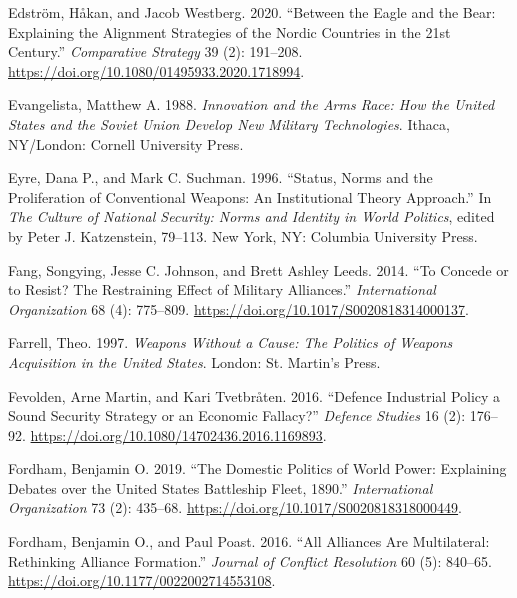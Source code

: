 \documentclass[
  12,
  letterpaper,
  DIV=11,
  numbers=noendperiod]{scrartcl}
\newlength{\cslhangindent}
\newlength{\cslentryspacingunit} %
\newenvironment{CSLReferences}[2] %
 {%
  \setlength{\parindent}{0pt}
  \ifodd #1
  \let\oldpar\par
  \def\par{\hangindent=\cslhangindent\oldpar}
  \fi
  \setlength{\parskip}{#2\cslentryspacingunit}
 }%
 {}
\begin{document}
\begin{CSLReferences}{1}{0}
\leavevmode{}%
Edström, Håkan, and Jacob Westberg. 2020. {``Between the Eagle and the
Bear: {Explaining} the Alignment Strategies of the {Nordic} Countries in
the 21st Century.''} \emph{Comparative Strategy} 39 (2): 191--208.
\url{https://doi.org/10.1080/01495933.2020.1718994}.

\leavevmode{}%
Evangelista, Matthew A. 1988. \emph{Innovation and the {Arms Race}:
{How} the {United States} and the {Soviet Union Develop New Military
Technologies}}. {Ithaca, NY/London}: {Cornell University Press}.

\leavevmode{}%
Eyre, Dana P., and Mark C. Suchman. 1996. {``Status, {Norms} and the
{Proliferation} of {Conventional Weapons}: {An Institutional Theory
Approach}.''} In \emph{The {Culture} of {National Security}: {Norms} and
{Identity} in {World Politics}}, edited by Peter J. Katzenstein,
79--113. {New York, NY}: {Columbia University Press}.

\leavevmode{}%
Fang, Songying, Jesse C. Johnson, and Brett Ashley Leeds. 2014. {``To
{Concede} or to {Resist}? {The Restraining Effect} of {Military
Alliances}.''} \emph{International Organization} 68 (4): 775--809.
\url{https://doi.org/10.1017/S0020818314000137}.

\leavevmode{}%
Farrell, Theo. 1997. \emph{Weapons {Without} a {Cause}: {The Politics}
of {Weapons Acquisition} in the {United States}}. {London}: {St.
Martin's Press}.

\leavevmode{}%
Fevolden, Arne Martin, and Kari Tvetbråten. 2016. {``Defence Industrial
Policy \textendash{} a Sound Security Strategy or an Economic
Fallacy?''} \emph{Defence Studies} 16 (2): 176--92.
\url{https://doi.org/10.1080/14702436.2016.1169893}.

\leavevmode{}%
Fordham, Benjamin O. 2019. {``The {Domestic Politics} of {World Power}:
{Explaining Debates} over the {United States Battleship Fleet},
1890.''} \emph{International Organization} 73 (2):
435--68. \url{https://doi.org/10.1017/S0020818318000449}.

\leavevmode{}%
Fordham, Benjamin O., and Paul Poast. 2016. {``All {Alliances Are
Multilateral}: {Rethinking Alliance Formation}.''} \emph{Journal of
Conflict Resolution} 60 (5): 840--65.
\url{https://doi.org/10.1177/0022002714553108}.


\end{CSLReferences}
\end{document}
